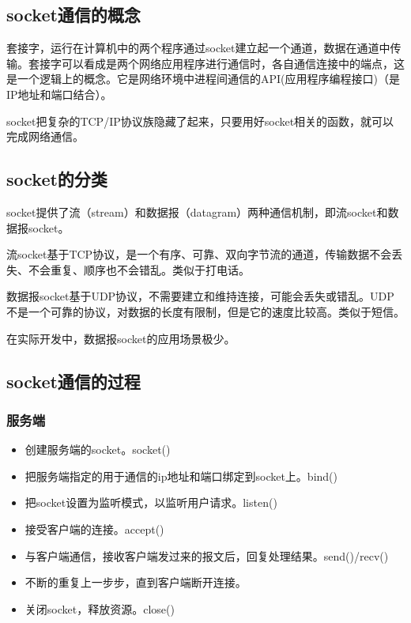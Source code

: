 \documentclass[UTF8]{article}%
\begin{document}
\subsection{socket通信的概念}

套接字，运行在计算机中的两个程序通过socket建立起一个通道，数据在通道中传输。套接字可以看成是两个网络应用程序进行通信时，各自通信连接中的端点，这是一个逻辑上的概念。它是网络环境中进程间通信的API(应用程序编程接口)（是IP地址和端口结合）。

socket把复杂的TCP/IP协议族隐藏了起来，只要用好socket相关的函数，就可以完成网络通信。

\subsection{socket的分类}

socket提供了流（stream）和数据报（datagram）两种通信机制，即流socket和数据报socket。

流socket基于TCP协议，是一个有序、可靠、双向字节流的通道，传输数据不会丢失、不会重复、顺序也不会错乱。类似于打电话。

数据报socket基于UDP协议，不需要建立和维持连接，可能会丢失或错乱。UDP不是一个可靠的协议，对数据的长度有限制，但是它的速度比较高。类似于短信。

在实际开发中，数据报socket的应用场景极少。

\subsection{socket通信的过程}

\subsubsection{服务端}

\begin{itemize}
    \item 创建服务端的socket。socket()
    \item 把服务端指定的用于通信的ip地址和端口绑定到socket上。bind()
    \item 把socket设置为监听模式，以监听用户请求。listen()
    \item 接受客户端的连接。accept()
    \item 与客户端通信，接收客户端发过来的报文后，回复处理结果。send()/recv()
    \item 不断的重复上一步步，直到客户端断开连接。
    \item 关闭socket，释放资源。close()
\end{itemize}
\end{document}
